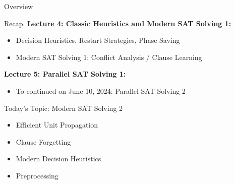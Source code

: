 \documentclass[t]{sdqbeamer}
\begin{document}
\begin{frame}{Overview}
    \begin{block}{Recap.}
        \textbf{Lecture 4: Classic Heuristics and Modern SAT Solving 1:}
        \begin{itemize}\setlength{\itemsep}{1ex}
            \item Decision Heuristics, Restart Strategies, Phase Saving
            \item Modern SAT Solving 1: Conflict Analysis / Clause Learning
        \end{itemize}
        \textbf{Lecture 5: Parallel SAT Solving 1:}
        \begin{itemize}\setlength{\itemsep}{1ex}
            \item To continued on June 10, 2024: Parallel SAT Solving 2
        \end{itemize}
    \end{block}
	\begin{block}{Today's Topic: Modern SAT Solving 2}
		\begin{itemize}\setlength{\itemsep}{1ex}
			\item Efficient Unit Propagation
			\item Clause Forgetting
			\item Modern Decision Heuristics
			\item Preprocessing
		\end{itemize}
	\end{block}
\end{frame}
\end{document}
